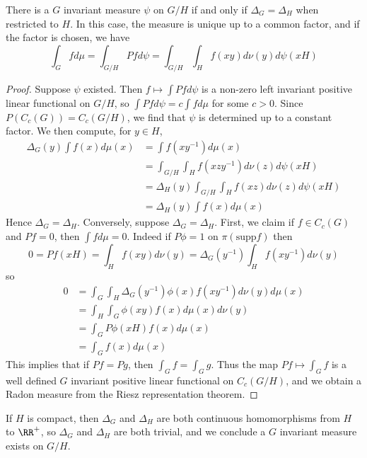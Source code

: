\begin{theorem}
    There is a $G$ invariant measure $\psi$ on $G/H$ if and only if $\Delta_G = \Delta_H$ when restricted to $H$. In this case, the measure is unique up to a common factor, and if the factor is chosen, we have
    \[ \int_G f d\mu = \int_{G/H} Pf d\psi = \int_{G/H} \int_H f(xy) d\nu(y) d\psi(xH) \]
\end{theorem}
\begin{proof}
    Suppose $\psi$ existed. Then $f \mapsto \int Pf d \psi$ is a non-zero left invariant positive linear functional on $G/H$, so $\int Pf d\psi = c \int f d\mu$ for some $c > 0$. Since $P(C_c(G)) = C_c(G/H)$, we find that $\psi$ is determined up to a constant factor. We then compute, for $y \in H$,
    \begin{align*}
        \Delta_G(y) \int f(x) d\mu(x) &= \int f(xy^{-1}) d\mu(x)\\
        &= \int_{G/H} \int_H f(xzy^{-1}) d\nu(z) d\psi(xH)\\
        &= \Delta_H(y) \int_{G/H} \int_H f(xz) d\nu(z) d\psi(xH)\\
        &= \Delta_H(y) \int f(x) d\mu(x)
    \end{align*}
    Hence $\Delta_G = \Delta_H$. Conversely, suppose $\Delta_G = \Delta_H$. First, we claim if $f \in C_c(G)$ and $Pf = 0$, then $\int f d\mu = 0$. Indeed if $P\phi = 1$ on $\pi(\text{supp} f)$ then
    \[ 0 = Pf(xH) = \int_H f(xy) d\nu(y) = \Delta_G(y^{-1}) \int_H f(xy^{-1}) d\nu(y) \]
    so
    \begin{align*}
        0 &= \int_G \int_H \Delta_G(y^{-1}) \phi(x) f(xy^{-1}) d\nu(y) d\mu(x)\\
        &= \int_H \int_G \phi(xy) f(x) d\mu(x) d\nu(y)\\
        &= \int_G P\phi(xH) f(x) d\mu(x)\\
        &= \int_G f(x) d\mu(x)
    \end{align*}
    This implies that if $Pf = Pg$, then $\int_G f = \int_G g$. Thus the map $Pf \mapsto \int_G f$ is a well defined $G$ invariant positive linear functional on $C_c(G/H)$, and we obtain a Radon measure from the Riesz representation theorem.
\end{proof}

If $H$ is compact, then $\Delta_G$ and $\Delta_H$ are both continuous homomorphisms from $H$ to $\RR^+$, so $\Delta_G$ and $\Delta_H$ are both trivial, and we conclude a $G$ invariant measure exists on $G/H$.

